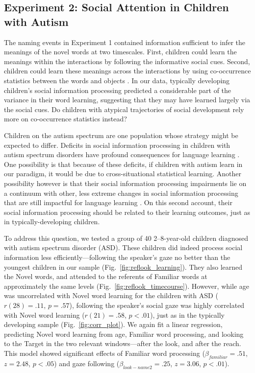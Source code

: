 \documentclass{pnastwo}
\begin{document}
\begin{article}
\section{Experiment 2: Social Attention in Children with Autism}

The naming events in Experiment 1 contained information sufficient to infer the meanings of the novel words at two timescales. First, children could learn the meanings within the interactions by following the informative social cues. Second, children could learn these meanings across the interactions by using co-occurrence statistics between the words and objects \citep{smith2008}. In our data, typically developing children's social information processing predicted a considerable part of the variance in their word learning, suggesting that they may have learned largely via the social cues. Do children with atypical trajectories of social development rely more on co-occurrence statistics instead?

Children on the autism spectrum are one population whose strategy might be expected to differ. Deficits in social information processing in children with autism spectrum disorders have profound consequences for language learning \cite{baron-cohen1997,leekam1998}. One possibility is that because of these deficits, if children with autism learn in our paradigm, it would be due to cross-situational statistical learning. Another possibility however is that their social information processing impairments lie on a continuum with other, less extreme changes in social information processing that are still impactful for language learning \cite{brooks2005}. On this second account, their social information processing should be related to their learning outcomes, just as in typically-developing children.

To address this question, we tested a group of 40 2--8-year-old children diagnosed with autism spectrum disorder (ASD). These children did indeed process social information less efficiently---following the speaker's gaze no better than the youngest children in our sample (Fig.~\ref{fig:reflook_learning}). They also learned the Novel words, and attended to the referents of Familiar words at approximately the same levels (Fig.~\ref{fig:reflook_timecourse}). However, while age was uncorrelated with Novel word learning for the children with ASD ($r(28) = .11$, $p =.57$), following the speaker's social gaze was highly correlated with Novel word learning ($r(21) = .58$, $p <.01$), just as in the typically developing sample (Fig.~\ref{fig:corr_plot}). We again fit a linear regression, predicting Novel word learning from age, Familiar word processing, and looking to the Target in the two relevant windows---after the look, and after the reach. This model showed significant effects of Familiar word processing ($\beta_{familiar} = .51$, $z = 2.48$, $p < . 05$) and gaze following ($\beta_{look-name2} = .25$, $z = 3.06$, $p < .01$).


\end{article}
\end{document}
